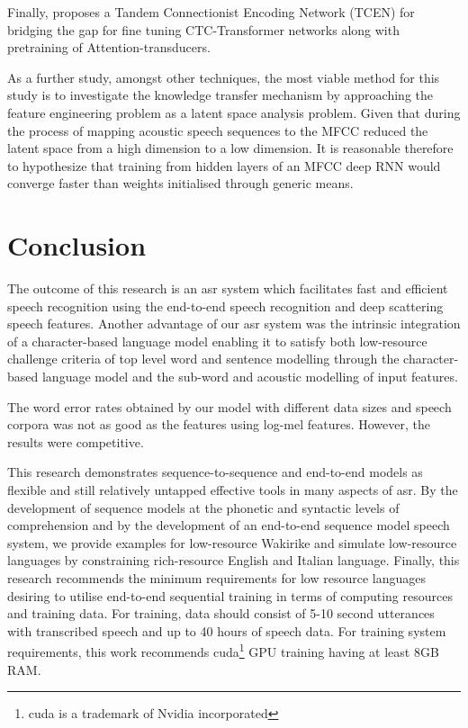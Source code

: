 Finally, \cite{wang2019bridging} proposes a Tandem Connectionist Encoding Network (TCEN) for bridging the gap for fine tuning CTC-Transformer networks along with pretraining of Attention-transducers.

As a further study, amongst other techniques, the most viable method for this study is to investigate the knowledge transfer mechanism by approaching the feature engineering problem as a latent space analysis problem.  Given that during the process of mapping acoustic speech sequences to the MFCC reduced the latent space from a high dimension to a low dimension.  It is reasonable therefore to hypothesize that training from hidden layers of an MFCC deep RNN would converge faster than weights initialised through generic means.

\startblue
\section{Conclusion}

The outcome of this research is an \acrshort{asr} system which facilitates fast and efficient speech recognition using the end-to-end speech recognition and deep scattering speech features.  Another advantage of our \acrshort{asr} system was the intrinsic integration of a character-based language model enabling it to satisfy both low-resource challenge criteria of top level word and sentence modelling through the character-based language model and the sub-word and acoustic modelling of input features.

The word error rates obtained by our model with different data sizes and speech corpora was not as good as the features using log-mel features. However, the results were competitive.

This research demonstrates sequence-to-sequence and end-to-end models as flexible and still relatively untapped effective tools in many aspects of \acrshort{asr}.  By the development of sequence models at the phonetic and syntactic levels of comprehension and by the development of an end-to-end sequence model speech system, we provide examples for low-resource Wakirike and simulate low-resource languages by constraining rich-resource English and Italian language.   Finally, this research recommends the minimum requirements for low resource languages desiring to utilise end-to-end sequential training in terms of computing resources and training data.  For training, data should consist of 5-10 second utterances with transcribed speech and up to 40 hours of speech data.  For training system requirements, this work recommends \acrshort{cuda}\footnote{\acrfull{cuda} is a trademark of Nvidia incorporated} GPU training having at least 8GB RAM.
 
\stopblue



